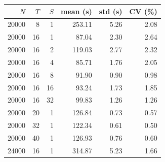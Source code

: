 \begin{tabular}{rrrrrr}
\toprule
$N$ & $T$ & $S$ & mean (s) & std (s) & CV (\%) \\
\midrule
20000 & 8 & 1 & 253.11 & 5.26 & 2.08 \\
20000 & 16 & 1 & 87.04 & 2.30 & 2.64 \\
20000 & 16 & 2 & 119.03 & 2.77 & 2.32 \\
20000 & 16 & 4 & 85.71 & 1.76 & 2.05 \\
20000 & 16 & 8 & 91.90 & 0.90 & 0.98 \\
20000 & 16 & 16 & 93.24 & 1.73 & 1.85 \\
20000 & 16 & 32 & 99.83 & 1.26 & 1.26 \\
20000 & 20 & 1 & 126.84 & 0.73 & 0.57 \\
20000 & 32 & 1 & 122.34 & 0.61 & 0.50 \\
20000 & 40 & 1 & 126.93 & 0.76 & 0.60 \\
24000 & 16 & 1 & 314.87 & 5.23 & 1.66 \\
\bottomrule
\end{tabular}
